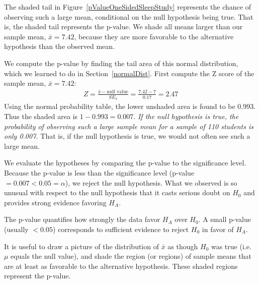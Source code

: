 The shaded tail in Figure~\ref{pValueOneSidedSleepStudy} represents the chance of observing such a large mean, conditional on the null hypothesis being true. That is, the shaded tail represents the p-value. We shade all means larger than our sample mean, $\bar{x} = 7.42$, because they are more favorable to the alternative hypothesis than the observed mean.

We compute the p-value by finding the tail area of this normal distribution, which we learned to do in Section~\ref{normalDist}. First compute the Z score of the sample mean, $\bar{x} = 7.42$:
\begin{eqnarray*}
Z = \frac{\bar{x} - \text{null value}}{SE_{\bar{x}}} = \frac{7.42 - 7}{0.17} = 2.47
\end{eqnarray*}
Using the normal probability table, the lower unshaded area is found to be 0.993. Thus the shaded area is $1-0.993 = 0.007$. {\em If the null hypothesis is true, the probability of observing such a large sample mean for a sample of 110 students is only 0.007.} That is, if the null hypothesis is true, we would not often see such a large mean.

We evaluate the hypotheses by comparing the p-value to the significance level. Because the p-value is less than the significance level (p-value $=0.007 < 0.05=\alpha$), we reject the null hypothesis. What we observed is so unusual with respect to the null hypothesis that it casts serious doubt on $H_0$ and provides strong evidence favoring $H_A$.

\begin{termBox}{
The p-value quantifies how strongly the data favor $H_A$ over $H_0$. A small p-value (usually $<0.05$) corresponds to sufficient evidence to reject $H_0$ in favor of $H_A$.}
\end{termBox}

\begin{tipBox}{
It is useful to draw a picture of the distribution of $\bar{x}$ as though $H_0$ was true (i.e. $\mu$ equals the null value), and shade the region (or regions) of sample means that are at least as favorable to the alternative hypothesis. These shaded regions represent the p-value.}
\end{tipBox}

